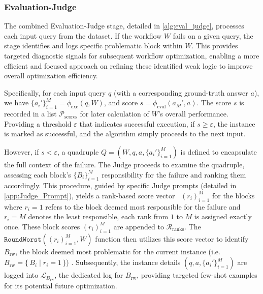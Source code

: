 \documentclass{article}
\theoremstyle{plain}
\theoremstyle{definition}
\theoremstyle{remark}
\begin{document}
\subsubsection{Evaluation-Judge}
The combined Evaluation-Judge stage, detailed in \cref{alg:eval_judge}, processes each input query from the dataset. If the workflow $W$ fails on a given query, the stage identifies and logs specific problematic block within $W$. This provides targeted diagnostic signals for subsequent workflow optimization, enabling a more efficient and focused approach on refining these identified weak logic to improve overall optimization efficiency.

Specifically, for each input query $q$ (with a corresponding ground-truth answer $a$), we have $\{a_i'\}_{i=1}^M=\phi_{\text{exe}}(q, W)$, and score $s=\phi_{\text{eval}}(a_M', a)$. The score $s$ is recorded in a list $\mathcal{P}_{\text{scores}}$ for later calculation of $W$'s overall performance. Providing a threshold $\varepsilon$ that indicates successful execution, if $s \geq \varepsilon$, the instance is marked as successful, and the algorithm simply proceeds to the next input.

However, if $s < \varepsilon$, a quadruple $Q=(W, q, a, \{a_i'\}_{i=1}^M)$ is defined to encapsulate the full context of the failure. The Judge proceeds to examine the quadruple, assessing each block's $\{B_i\}_{i=1}^M$ responsibility for the failure and ranking them accordingly. This procedure, guided by specific Judge prompts (detailed in \cref{app:Judge_Prompt}), yields a rank-based score vector~\citep{liu_aligning_2025} $(r_i)_{i=1}^M$ for the blocks where $r_i=1$ refers to the block deemed most responsible for the failure and $r_i=M$ denotes the least responsible, each rank from $1$ to $M$ is assigned exactly once. These block scores $(r_i)_{i=1}^M$ are appended to $\mathcal{R}_{\text{ranks}}$. The $\texttt{RoundWorst}((r_i)_{i=1}^M, W)$ function then utilizes this score vector to identify $B_{\text{rw}}$, the block deemed most problematic for the current instance (i.e. $B_{\text{rw}} = \{\, B_i \mid r_i = 1 \,\}$) . Subsequently, the instance details $(q, a, \{a_i'\}_{i=1}^M)$ are logged into $\mathcal{L}_{B_{\text{rw}}}$, the dedicated log for $B_{\text{rw}}$, providing targeted few-shot examples for its potential future optimization.
\end{document}
